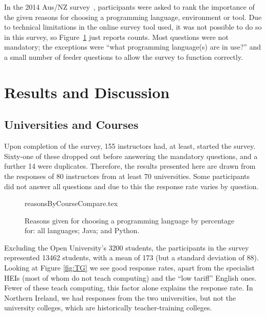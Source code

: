 \documentclass{sig-alternate}
\begin{document}
In the 2014 Aus/NZ survey~\cite{mason+cooper:2014}, participants were
asked to rank the importance of the given reasons for choosing a
programming language, environment or tool. Due to technical
limitations in the online survey tool used, it was not possible to do
so in this survey, so Figure~\ref{fig:reasons} just reports
counts. Most questions were not mandatory; the exceptions were ``what
programming language(s) are in use?'' and a small number of feeder
questions to allow the survey to function correctly.

\section{Results and Discussion}\label{results}

\subsection{Universities and Courses}

Upon completion of the survey, 155 instructors had, at least, started
the survey. Sixty-one of these dropped out before answering the
mandatory questions, and a further 14 were duplicates. Therefore, the
results presented here are drawn from the responses of 80 instructors
from at least 70 universities. Some participants did not answer all
questions and due to this the response rate varies by question.


\begin{figure}
\begin{center}
{reasonsByCourseCompare.tex}
\end{center}\vskip-18pt
\caption{Reasons given for choosing a programming language by percentage for: all languages; Java; and Python.\label{fig:reasons}}
\end{figure}
\par
Excluding the Open University's 3200 students, the participants in the
survey represented 13462 students, with a mean of 173 (but a standard
deviation of 88). Looking at Figure \ref{fig:TG} we see good response
rates, apart from the specialist HEIs (most of whom do not teach
computing) and the ``low tariff'' English ones. Fewer of these teach
computing, %
this factor alone explains the response rate. In Northern Ireland, we
had responses from the two universities, but not the university
colleges, which are historically teacher-training colleges.
\end{document}
